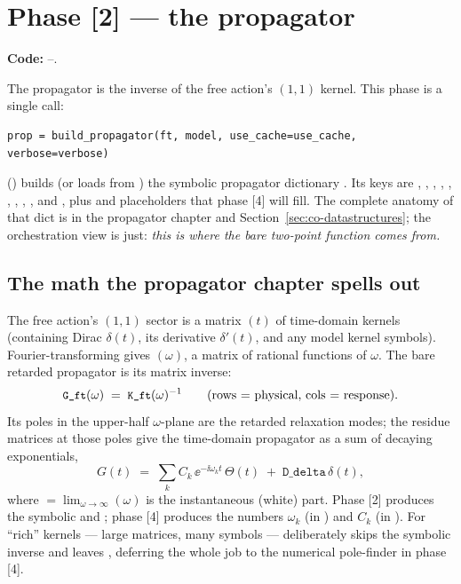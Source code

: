 \section{Phase [2] --- the propagator}\label{sec:co-prop}

\textbf{Code:} --.

The propagator is the inverse of the free action's $(1,1)$ kernel. This phase is
a single call:

\begin{lstlisting}
prop = build_propagator(ft, model, use_cache=use_cache, verbose=verbose)
\end{lstlisting}

 () builds (or loads
from ) the symbolic propagator
dictionary . Its keys are , , ,
, , , , ,
, and , plus  and 
placeholders that phase [4] will fill. The complete anatomy of that dict is in
the propagator chapter and Section~\ref{sec:co-datastructures}; the orchestration
view is just: \emph{this is where the bare two-point function comes from.}

\subsection{The math the propagator chapter spells out}

The free action's $(1,1)$ sector is a matrix $(t)$ of time-domain
kernels (containing Dirac $\delta(t)$, its derivative $\delta'(t)$, and any model
kernel symbols). Fourier-transforming gives $(\omega)$, a matrix of
rational functions of $\omega$. The bare retarded propagator is its matrix
inverse:
\begin{equation}
  \text{\texttt{\small G\_ft}}(\omega) \;=\; \text{\texttt{\small K\_ft}}(\omega)^{-1}
  \qquad\text{(rows = physical, cols = response).}
  \label{eq:co-Gft}
\end{equation}
Its poles in the upper-half $\omega$-plane are the retarded relaxation modes; the
residue matrices  at those poles give the time-domain propagator as
a sum of decaying exponentials,
\begin{equation}
  G(t)
  \;=\;
  \sum_k C_k\, \ee^{-\ii \omega_k t}\,\Theta(t)
  \;+\;
  \texttt{D\_delta}\,\delta(t),
  \label{eq:co-Gt}
\end{equation}
where $= \lim_{\omega\to\infty}$$(\omega)$ is the
instantaneous (white) part. Phase [2] produces the symbolic  and
; phase [4] produces the numbers $\omega_k$ (in )
and $C_k$ (in ). For ``rich'' kernels --- large matrices, many
symbols ---  deliberately skips the symbolic inverse and
leaves , deferring the whole job to the numerical pole-finder
in phase [4].

